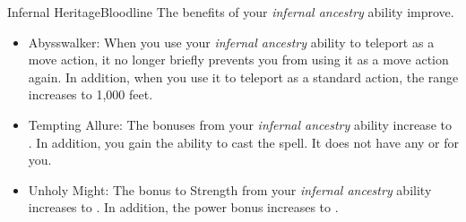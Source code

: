 \begin{feat}{Infernal Heritage}{Bloodline}
         The benefits of your \textit{infernal ancestry} ability improve.
        \begin{itemize}
            \item Abysswalker: When you use your \textit{infernal ancestry} ability to teleport as a move action, it no longer briefly prevents you from using it as a move action again.
                In addition, when you use it to teleport as a standard action, the range increases to 1,000 feet.
            \item Tempting Allure: The bonuses from your \textit{infernal ancestry} ability increase to .
                In addition, you gain the ability to cast the  spell.
                It does not have any  or  for you.
            \item Unholy Might: The bonus to Strength from your \textit{infernal ancestry} ability increases to .
                In addition, the power bonus increases to .
        \end{itemize}
    \end{feat}

